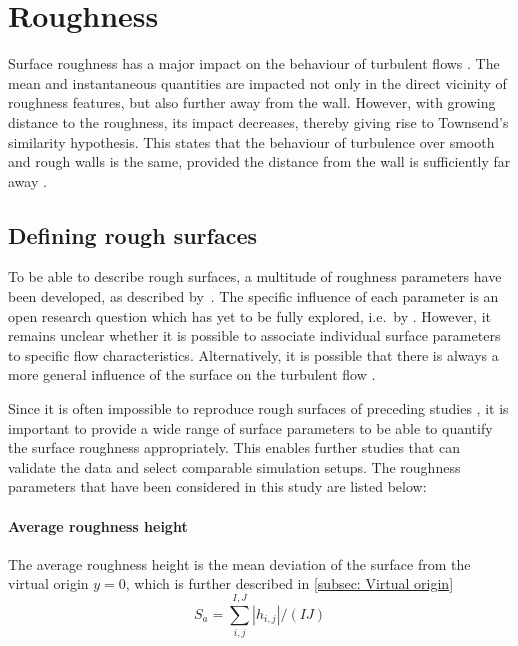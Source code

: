\section{Roughness}\label{sec: Roughness}
Surface roughness has a major impact on the behaviour of turbulent flows \citep{chungPredictingDragRough2021}.
The mean and instantaneous quantities are impacted not only in the direct vicinity of roughness features, but also further away from the wall.
However, with growing distance to the roughness, its impact decreases, thereby giving rise to Townsend's similarity hypothesis.
This states that the behaviour of turbulence over smooth and rough walls is the same, provided the distance from the wall is sufficiently far away \citep{chungPredictingDragRough2021}.
\subsection{Defining rough surfaces}\label{subsec: defining rough surfaces}
To be able to describe rough surfaces, a multitude of roughness parameters have been developed, as described by~\cite{chungPredictingDragRough2021}.
The specific influence of each parameter is an open research question which has yet to be fully explored, i.e.\ by \citep{flackReviewHydraulicRoughness2010,jellyReynoldsDispersiveShear2018}.
However, it remains unclear whether it is possible to associate individual surface parameters to specific flow characteristics.
Alternatively, it is possible that there is always a more general influence of the surface on the turbulent flow \citep{chungPredictingDragRough2021}.

Since it is often impossible to reproduce rough surfaces of preceding studies \citep{chungPredictingDragRough2021}, it is important to provide a wide range of surface parameters to be able to  quantify the surface roughness appropriately.
This enables further studies that can validate the data and select comparable simulation setups.
The roughness parameters that have been considered in this study are listed below:
\paragraph{Average roughness height}
The average roughness height is the mean deviation  of the surface from the virtual origin $y=0$, which is further described in \autoref{subsec: Virtual origin}
\begin{equation}\label{eq: avg roughness height}
    S_a = \sum_{i,j}^{I,J} |h_{i,j}| / (IJ)
\end{equation}
